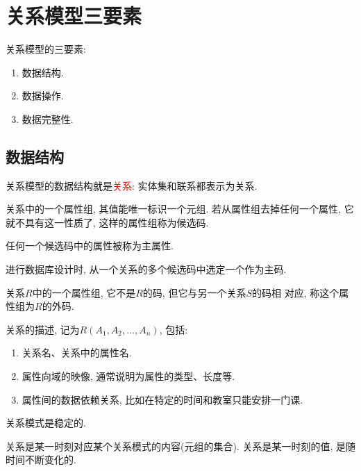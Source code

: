 \section{关系模型三要素}

关系模型的三要素:
\begin{enumerate}
    \item 数据结构.
    \item 数据操作.
    \item 数据完整性.
\end{enumerate}

\subsection{数据结构}

关系模型的数据结构就是\textcolor{red}{关系}: 实体集和联系都表示为关系.

\begin{definition}
关系中的一个属性组, 其值能唯一标识一个元组. 
若从属性组去掉任何一个属性, 它就不具有这一性质了, 这样的属性组称为候选码.
\end{definition}

\begin{definition}[主属性]
任何一个候选码中的属性被称为主属性.
\end{definition}

\begin{definition}
进行数据库设计时, 从一个关系的多个候选码中选定一个作为主码.
\end{definition}

\begin{definition}
关系$R$中的一个属性组, 它不是$R$的码, 但它与另一个关系$S$的码相
对应, 称这个属性组为$R$的外码.
\end{definition}

\begin{definition}[关系模式]
关系的描述, 记为$R(A_1,A_2,...,A_n)$, 包括:
\begin{enumerate}
    \item 关系名、关系中的属性名.
    \item 属性向域的映像, 通常说明为属性的类型、长度等.
    \item 属性间的数据依赖关系, 比如在特定的时间和教室只能安排一门课.
\end{enumerate}
关系模式是稳定的.
\end{definition}

\begin{definition}[关系]
关系是某一时刻对应某个关系模式的内容(元组的集合). 关系是某一时刻的值, 是随时间不断变化的.
\end{definition}

